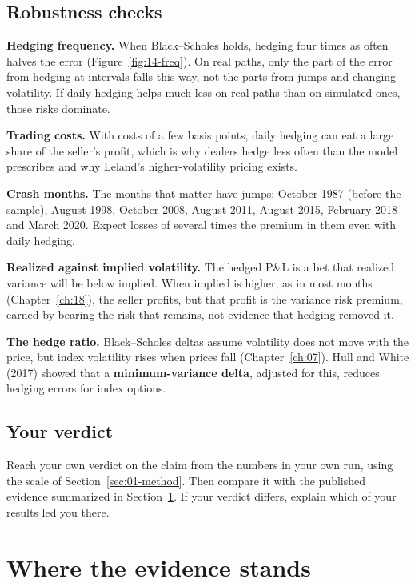 \subsection{Robustness checks}
\label{sec:14-stress}

\textbf{Hedging frequency.} When Black--Scholes holds, hedging four times as often halves the error (Figure~\ref{fig:14-freq}). On real paths, only the part of the error from hedging at intervals falls this way, not the parts from jumps and changing volatility. If daily hedging helps much less on real paths than on simulated ones, those risks dominate.

\textbf{Trading costs.} With costs of a few basis points, daily hedging can eat a large share of the seller's profit, which is why dealers hedge less often than the model prescribes and why Leland's higher-volatility pricing exists.

\textbf{Crash months.} The months that matter have jumps: October 1987 (before the sample), August 1998, October 2008, August 2011, August 2015, February 2018 and March 2020. Expect losses of several times the premium in them even with daily hedging.

\textbf{Realized against implied volatility.} The hedged P\&L is a bet that realized variance will be below implied. When implied is higher, as in most months (Chapter~\ref{ch:18}), the seller profits, but that profit is the variance risk premium, earned by bearing the risk that remains, not evidence that hedging removed it.

\textbf{The hedge ratio.} Black--Scholes deltas assume volatility does not move with the price, but index volatility rises when prices fall (Chapter~\ref{ch:07}). Hull and White (2017) showed that a \textbf{minimum-variance delta}, adjusted for this, reduces hedging errors for index options.

\subsection*{Your verdict}

Reach your own verdict on the claim from the numbers in your own run, using the scale of Section~\ref{sec:01-method}. Then compare it with the published evidence summarized in Section~\ref{sec:14-verdict}. If your verdict differs, explain which of your results led you there.

\section{Where the evidence stands}
\label{sec:14-verdict}

